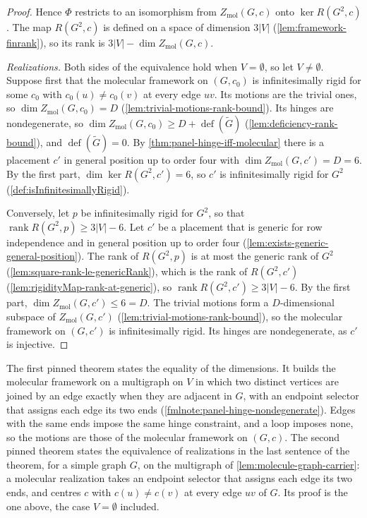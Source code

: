 \begin{proof}
  Hence $\Phi$ restricts to an isomorphism from $Z_{\mathrm{mol}}(G, c)$
  onto $\ker R(G^2, c)$. The map $R(G^2, c)$ is defined on a space of
  dimension $3|V|$ (\cref{lem:framework-finrank}), so its rank is
  $3|V| - \dim Z_{\mathrm{mol}}(G, c)$.

  \emph{Realizations.} Both sides of the equivalence hold when
  $V = \emptyset$, so let $V \neq \emptyset$. Suppose first that the
  molecular framework on $(G, c_0)$ is infinitesimally rigid for some
  $c_0$ with $c_0(u) \neq c_0(v)$ at every edge $uv$. Its motions are the
  trivial ones, so $\dim Z_{\mathrm{mol}}(G, c_0) = D$
  (\cref{lem:trivial-motions-rank-bound}). Its hinges are nondegenerate,
  so $\dim Z_{\mathrm{mol}}(G, c_0) \ge D + \operatorname{def}(\tilde G)$
  (\cref{lem:deficiency-rank-bound}), and
  $\operatorname{def}(\tilde G) = 0$. By
  \cref{thm:panel-hinge-iff-molecular} there is a placement $c'$ in
  general position up to order four with
  $\dim Z_{\mathrm{mol}}(G, c') = D = 6$. By the first part,
  $\dim \ker R(G^2, c') = 6$, so $c'$ is infinitesimally rigid for $G^2$
  (\cref{def:isInfinitesimallyRigid}).

  Conversely, let $p$ be infinitesimally rigid for $G^2$, so that
  $\operatorname{rank} R(G^2, p) \ge 3|V| - 6$. Let $c'$ be a placement
  that is generic for row independence and in general position up to
  order four (\cref{lem:exists-generic-general-position}). The rank of
  $R(G^2, p)$ is at most the generic rank of $G^2$
  (\cref{lem:square-rank-le-genericRank}), which is the rank of
  $R(G^2, c')$ (\cref{lem:rigidityMap-rank-at-generic}), so
  $\operatorname{rank} R(G^2, c') \ge 3|V| - 6$. By the first part,
  $\dim Z_{\mathrm{mol}}(G, c') \le 6 = D$. The trivial motions form a
  $D$-dimensional subspace of $Z_{\mathrm{mol}}(G, c')$
  (\cref{lem:trivial-motions-rank-bound}), so the molecular framework on
  $(G, c')$ is infinitesimally rigid. Its hinges are nondegenerate, as
  $c'$ is injective.
\end{proof}

\begin{fmlnote}
  The first pinned theorem states the equality of the dimensions. It
  builds the molecular framework on a multigraph on $V$ in which two
  distinct vertices are joined by an edge exactly when they are adjacent
  in $G$, with an endpoint selector that assigns each edge its two ends
  (\cref{fmlnote:panel-hinge-nondegenerate}). Edges with the same ends
  impose the same hinge constraint, and a loop imposes none, so the
  motions are those of the molecular framework on $(G, c)$. The second
  pinned theorem states the equivalence of realizations in the last
  sentence of the theorem, for a simple graph $G$, on the multigraph of
  \cref{lem:molecule-graph-carrier}: a molecular realization takes an
  endpoint selector that assigns each edge its two ends, and centres
  $c$ with $c(u) \neq c(v)$ at every edge $uv$ of $G$. Its proof is the
  one above, the case $V = \emptyset$ included.
\end{fmlnote}
